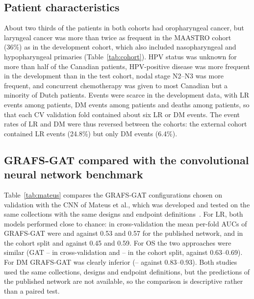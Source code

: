\documentclass[11pt,a4paper]{article}
\newcommand{\method}{GRAFS-GAT}
\begin{document}
\subsection{Patient characteristics}
About two thirds of the patients in both cohorts had oropharyngeal cancer, but laryngeal cancer was more than twice as frequent in the MAASTRO cohort (36\%) as in the development cohort, which also included nasopharyngeal and hypopharyngeal primaries (Table~\ref{tab:cohort}). HPV status was unknown for more than half of the Canadian patients, HPV-positive disease was more frequent in the development than in the test cohort, nodal stage N2--N3 was more frequent, and concurrent chemotherapy was given to most Canadian but a minority of Dutch patients. Events were scarce in the development data, with \eLRHNPET{} LR events among \nLRHNPET{} patients, \eDMHNPET{} DM events among \nDMHNPET{} patients and \eOSHNPET{} deaths among \nOSHNPET{} patients, so that each CV validation fold contained about six LR or DM events. The event rates of LR and DM were thus reversed between the cohorts: the external cohort contained \eLRMAASTRO{} LR events (24.8\%) but only \eDMMAASTRO{} DM events (6.4\%).

\subsection{\method{} compared with the convolutional neural network benchmark}
Table~\ref{tab:mateus} compares the \method{} configurations chosen on validation with the CNN of Mateus et al., which was developed and tested on the same collections with the same designs and endpoint definitions~\cite{mateus2023}. For LR, both models performed close to chance: in cross-validation the mean per-fold AUCs of \method{} were \foldLRImg{} and \foldLRClin{} against 0.53 and 0.57 for the published network, and in the cohort split \aucLRCohImgChosen{} and \aucLRCohClinChosen{} against 0.45 and 0.59. For OS the two approaches were similar (GAT \foldOSImg--\foldOSClin{} in cross-validation and \aucOSCohImgChosen--\aucOSCohClinChosen{} in the cohort split, against 0.63--0.69). For DM \method{} was clearly inferior (\foldDMClin--\aucDMCohClinChosen{} against 0.83--0.93). Both studies used the same collections, designs and endpoint definitions, but the predictions of the published network are not available, so the comparison is descriptive rather than a paired test.
\end{document}
